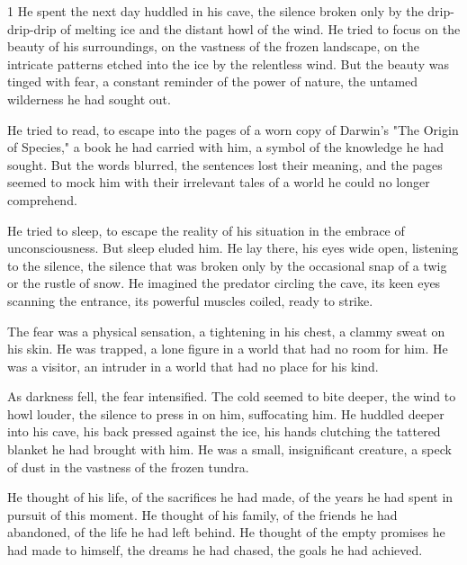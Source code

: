\documentclass{article}
\newcommand{\Agentsroomzs}{\textsc{Agents' Room$_{ZS}$}}
\begin{document}
\begin{tcolorbox}[colback=white, colframe=gray!30!white, coltitle=black, parskip=5mm, title=
    \textbf{System output: \Agentsroomzs}, breakable]
\begin{spacing}{1}
He spent the next day huddled in his cave, the silence broken only by the drip-drip-drip of melting ice and the distant howl of the wind. He tried to focus on the beauty of his surroundings, on the vastness of the frozen landscape, on the intricate patterns etched into the ice by the relentless wind. But the beauty was tinged with fear, a constant reminder of the power of nature, the untamed wilderness he had sought out.\\\par

He tried to read, to escape into the pages of a worn copy of Darwin's "The Origin of Species," a book he had carried with him, a symbol of the knowledge he had sought. But the words blurred, the sentences lost their meaning, and the pages seemed to mock him with their irrelevant tales of a world he could no longer comprehend.\\\par

He tried to sleep, to escape the reality of his situation in the embrace of unconsciousness. But sleep eluded him. He lay there, his eyes wide open, listening to the silence, the silence that was broken only by the occasional snap of a twig or the rustle of snow.  He imagined the predator circling the cave, its keen eyes scanning the entrance, its powerful muscles coiled, ready to strike.\\\par

The fear was a physical sensation, a tightening in his chest, a clammy sweat on his skin. He was trapped, a lone figure in a world that had no room for him.  He was a visitor, an intruder in a world that had no place for his kind.\\\par

As darkness fell, the fear intensified. The cold seemed to bite deeper, the wind to howl louder, the silence to press in on him, suffocating him.  He huddled deeper into his cave, his back pressed against the ice, his hands clutching the tattered blanket he had brought with him. He was a small, insignificant creature, a speck of dust in the vastness of the frozen tundra.\\\par

He thought of his life, of the sacrifices he had made, of the years he had spent in pursuit of this moment. He thought of his family, of the friends he had abandoned, of the life he had left behind. He thought of the empty promises he had made to himself, the dreams he had chased, the goals he had achieved.\\\par


\end{spacing}
\end{tcolorbox}
\end{document}
